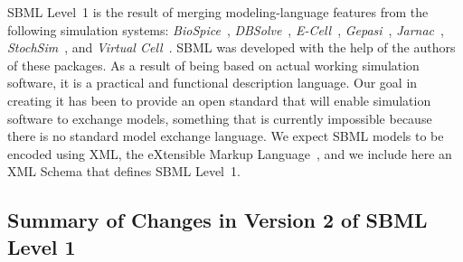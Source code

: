 \documentclass[10pt]{cekarticle}
\newcommand{\changed}[1]{\textcolor{BrickRed}{#1}}
\begin{document}
SBML Level~1 is the result of merging modeling-language features from the
following simulation systems: \emph{BioSpice}~\citep{arkin:2001},
\emph{DBSolve}~\citep{goryanin:2001,goryanin:1999},
\emph{E-Cell}~\citep{tomita:1999,tomita:2001},
\emph{Gepasi}~\citep{mendes:1997,mendes:2001},
\emph{Jarnac}~\citep{sauro:2000,sauro:1991},
\emph{StochSim}~\citep{bray:2001,morton-firth:1998}, and \emph{Virtual
  Cell}~\citep{schaff:2000,schaff:2001}.  SBML was developed with the help
of the authors of these packages.  As a result of being based on actual
working simulation software, it is a practical and functional description
language.  Our goal in creating it has been to provide an open standard
that will enable simulation software to exchange models, something that is
currently impossible because there is no standard model exchange language.
We expect SBML models to be encoded using XML, the eXtensible Markup
Language~\citep{bosak:1999,bray:1998}, and we include here an XML Schema
that defines SBML Level~1.

\subsection{\changed{Summary of Changes in Version 2 of SBML Level 1}}
\end{document}
